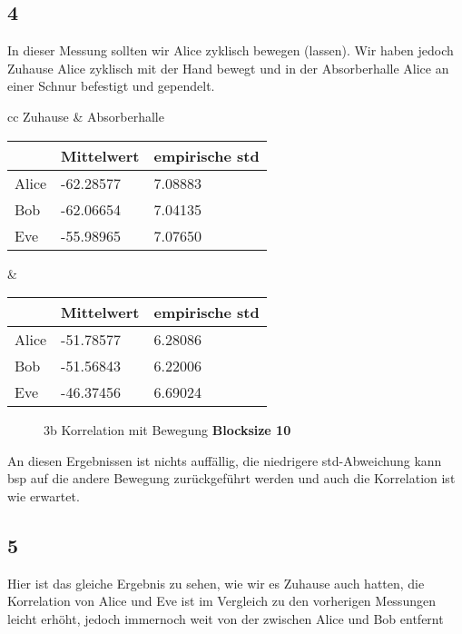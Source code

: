 \documentclass[12pt,a4paper]{article}
\begin{document}
\subsection*{4}
In dieser Messung sollten wir Alice zyklisch bewegen (lassen). Wir haben jedoch Zuhause Alice zyklisch mit der Hand bewegt und in der Absorberhalle Alice an einer Schnur befestigt und gependelt.
\begin{table}[H]
\centering
\begin{tabular}{ cc }
Zuhause & Absorberhalle  \\
\begin{tabular}{l|l|l}
& Mittelwert & empirische std \\
\hline
Alice & -62.28577 & 7.08883 \\
\hline
Bob & -62.06654 & 7.04135 \\
\hline
Eve & -55.98965 & 7.07650 \\
\end{tabular} &
\begin{tabular}{l|l|l}
& Mittelwert & empirische std \\
\hline
Alice & -51.78577 & 6.28086 \\
\hline
Bob & -51.56843 & 6.22006 \\
\hline
Eve & -46.37456 & 6.69024 \\
\end{tabular}
\end{tabular}
\end{table}

\begin{figure}[H]
\centering
{}   \qquad
{}
\caption{3b Korrelation mit Bewegung  \textbf{Blocksize 10}}
\label{fig:4}
\end{figure}
An diesen Ergebnissen ist nichts auffällig, die niedrigere std-Abweichung kann bsp auf die andere Bewegung zurückgeführt werden und auch die Korrelation ist wie erwartet.
\subsection*{5}
Hier ist das gleiche Ergebnis zu sehen, wie wir es Zuhause auch hatten, die Korrelation von Alice und Eve ist im Vergleich zu den vorherigen Messungen leicht erhöht, jedoch immernoch weit von der zwischen Alice und Bob entfernt
\end{document}
